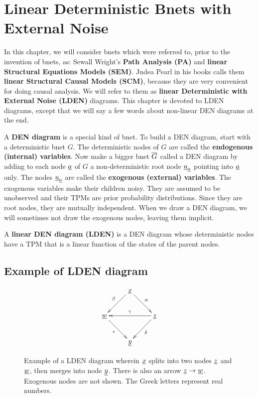 \chapter{Linear Deterministic Bnets 
with External 
Noise}\label{ch-linear-sys}

In this chapter, we will consider 
bnets which were referred to,
prior to the invention of bnets, as:
Sewall Wright's {\bf Path Analysis (PA)}
 and
{\bf linear Structural Equations Models (SEM)}.
Judea Pearl in his
books calls them
{\bf linear Structural Causal Models (SCM)},
because they are very 
convenient for doing causal analysis.
We will refer  to
them as {\bf linear  Deterministic with 
External Noise
 (LDEN)} diagrams.
This chapter
is devoted to LDEN diagrams,
except that we will
say a few words
about non-linear DEN
diagrams at the end.


A {\bf DEN diagram}
is a special kind of bnet.
To 
build a DEN diagram,
start with a 
deterministic bnet $G$.
The deterministic
nodes of $G$ are called
the {\bf endogenous (internal) variables}.
Now make a bigger bnet $\overline{G}$
called a DEN diagram
by 
adding to each node ${\underline{a}}$ of $G$ a
non-deterministic  
root node ${\underline{u}}_{\underline{a}}$
pointing into ${\underline{a}}$ only.
The nodes ${\underline{u}}_{\underline{a}}$ are called
the {\bf exogenous (external) variables}.
The exogenous
variables make their children noisy.
They are assumed 
to be unobserved
and their TPMs are prior
probability distributions.
Since they are 
root nodes, they are 
mutually independent.
When we
draw
a DEN diagram,
we will sometimes
not draw the exogenous nodes,
leaving them implicit.

A {\bf linear DEN diagram (LDEN)} is 
a DEN diagram
whose deterministic nodes
have a TPM that is a linear 
function of the states
of the parent nodes.


\section{Example
of LDEN diagram}


\begin{figure}[h!]
$$\xymatrix{
&\rvx\ar[dl]_\beta\ar[dr]^\alp
\\
\rvw\ar[dr]_\epsilon&&\rvz\ar[ll]_\gamma\ar[dl]^\delta
\\
&\rvy
}$$
\caption{
Example of a LDEN diagram wherein
${\underline{x}}$ splits
into two nodes ${\underline{z}}$
and ${\underline{w}}$,
then merges into node ${\underline{y}}$.
There is also an arrow
${\underline{z}}\rightarrow {\underline{w}}$.
Exogenous
nodes are not shown.
The Greek letters
represent 
real numbers.
}
\label{fig-scm-diamond}
\end{figure}

